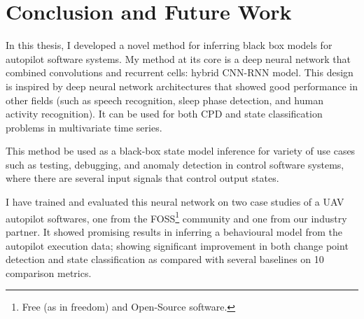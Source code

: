 \chapter{Conclusion and Future Work}\label{sec:summary} \label{sec:future_work}

In this thesis, I developed a novel method for inferring black box models for autopilot software systems.
My method at its core is a deep neural network that combined convolutions and recurrent cells: hybrid CNN-RNN model. 
This design is inspired by deep neural network architectures that showed good performance in other fields (such as speech recognition, sleep phase detection, and human activity recognition). 
It can be used for both CPD and state classification problems in multivariate time series. 

This method be used as a black-box state model inference for variety of use cases such as testing, debugging, and anomaly detection in control software systems, where there are several input signals that control output states. 

I have trained and evaluated this neural network on two case studies of a UAV autopilot softwares, one from the FOSS\footnote{Free (as in freedom) and Open-Source software.} community and one from our industry partner.
It showed promising results in inferring a behavioural model from the autopilot execution data; showing significant improvement in both change point detection and state classification as compared with several baselines on 10 comparison metrics.



